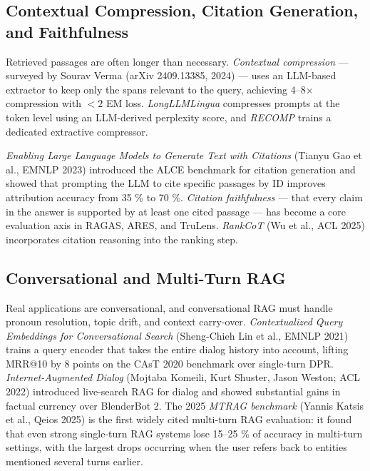 \documentclass{article}
\begin{document}
\subsection{Contextual Compression, Citation Generation, and Faithfulness}\label{contextual-compression-citation-generation-and-faithfulness}

Retrieved passages are often longer than necessary. \emph{Contextual compression} --- surveyed by Sourav Verma (arXiv 2409.13385, 2024) --- uses an LLM-based extractor to keep only the spans relevant to the query, achieving 4--8× compression with \(<2\) EM loss. \emph{LongLLMLingua} \citep{jiang2023activeretrievalaug} compresses prompts at the token level using an LLM-derived perplexity score, and \emph{RECOMP} \citep{xu2024searchinthechainto} trains a dedicated extractive compressor.

\emph{Enabling Large Language Models to Generate Text with Citations} (Tianyu Gao et al., EMNLP 2023) introduced the ALCE benchmark for citation generation and showed that prompting the LLM to cite specific passages by ID improves attribution accuracy from 35 \% to 70 \%. \emph{Citation faithfulness} --- that every claim in the answer is supported by at least one cited passage --- has become a core evaluation axis in RAGAS, ARES, and TruLens. \emph{RankCoT} (Wu et al., ACL 2025) incorporates citation reasoning into the ranking step.

\subsection{Conversational and Multi-Turn RAG}\label{conversational-and-multi-turn-rag}

Real applications are conversational, and conversational RAG must handle pronoun resolution, topic drift, and context carry-over. \emph{Contextualized Query Embeddings for Conversational Search} (Sheng-Chieh Lin et al., EMNLP 2021) trains a query encoder that takes the entire dialog history into account, lifting MRR@10 by 8 points on the CAsT 2020 benchmark over single-turn DPR. \emph{Internet-Augmented Dialog} (Mojtaba Komeili, Kurt Shuster, Jason Weston; ACL 2022) introduced live-search RAG for dialog and showed substantial gains in factual currency over BlenderBot 2. The 2025 \emph{MTRAG benchmark} (Yannis Katsis et al., Qeios 2025) is the first widely cited multi-turn RAG evaluation: it found that even strong single-turn RAG systems lose 15--25 \% of accuracy in multi-turn settings, with the largest drops occurring when the user refers back to entities mentioned several turns earlier.
\end{document}
